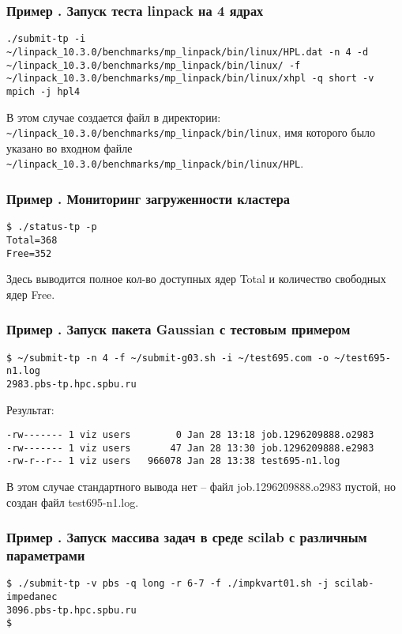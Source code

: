 \documentclass[a4paper,8pt]{extreport}
\newcounter{ex}
\begin{document}
\subsubsection{Пример . Запуск теста linpack на 4 ядрах}
\begin{lstlisting}
./submit-tp -i ~/linpack_10.3.0/benchmarks/mp_linpack/bin/linux/HPL.dat -n 4 -d ~/linpack_10.3.0/benchmarks/mp_linpack/bin/linux/ -f ~/linpack_10.3.0/benchmarks/mp_linpack/bin/linux/xhpl -q short -v mpich -j hpl4
\end{lstlisting}

В этом случае создается файл в директории: \verb*|~/linpack_10.3.0/benchmarks/mp_linpack/bin/linux|,
имя которого было  указано во входном файле \verb*|~/linpack_10.3.0/benchmarks/mp_linpack/bin/linux/HPL|.

\subsubsection{Пример . Мониторинг загруженности кластера}
\begin{lstlisting}
$ ./status-tp -p
Total=368
Free=352
\end{lstlisting}

Здесь выводится полное кол-во доступных ядер Total и количество свободных ядер Free.

\subsubsection{Пример . Запуск пакета Gaussian с тестовым примером}
\begin{lstlisting}
$ ~/submit-tp -n 4 -f ~/submit-g03.sh -i ~/test695.com -o ~/test695-n1.log
2983.pbs-tp.hpc.spbu.ru
\end{lstlisting}

Результат:
\begin{lstlisting}
-rw------- 1 viz users        0 Jan 28 13:18 job.1296209888.o2983
-rw------- 1 viz users       47 Jan 28 13:30 job.1296209888.e2983
-rw-r--r-- 1 viz users   966078 Jan 28 13:38 test695-n1.log
\end{lstlisting}

В этом случае стандартного вывода нет – файл  job.1296209888.o2983 пустой, но создан файл test695-n1.log.

\subsubsection{Пример . Запуск массива задач в среде scilab с различным параметрами}
\begin{lstlisting}
$ ./submit-tp -v pbs -q long -r 6-7 -f ./impkvart01.sh -j scilab-impedanec
3096.pbs-tp.hpc.spbu.ru
$
\end{lstlisting}
\end{document}
